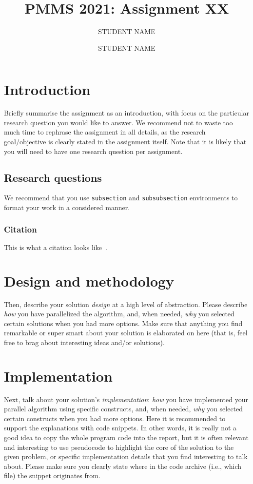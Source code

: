 \documentclass[a4paper,UKenglish,cleveref, autoref, thm-restate]{lipics-v2019}
\title{PMMS 2021: Assignment XX }
\author{STUDENT NAME}{STUDENT NUMBER}{EMAIL ADDRESS}{}{}
\author{STUDENT NAME}{STUDENT NUMBER}{EMAIL ADDRESS}{}{}
\begin{document}
	\maketitle
	


	
	\section{Introduction}
	Briefly summarise the assignment as an introduction, with focus on the particular research question you would like to answer. We recommend not to waste too much time to rephrase the assignment in all details, as the research goal/objective is clearly stated in the assignment itself. Note that it is likely that you will need to have one research question per assignment.

	\subsection{Research questions}
		We recommend that you use \texttt{subsection} and \texttt{subsubsection} environments to format your work in a considered manner.  

	\subsubsection{Citation}
		This is what a citation looks like~\cite{temp}.
		
	\section{Design and methodology}
		Then, describe your solution \textit{design} at a high level of abstraction. Please describe \textit{how} you have parallelized the algorithm, and, when needed, \textit{why} you selected certain solutions when you had more options. Make sure that anything you find remarkable or super smart about your solution is elaborated on here (that is, feel free to brag about interesting ideas and/or solutions).
	
	\section{Implementation}
		Next, talk about your solution's \textit{implementation}: \textit{how} you have implemented your parallel algorithm using specific constructs, and, when needed, \textit{why} you selected certain constructs when you had more options. Here it is recommended to support the explanations with code snippets. In other words, it is really not a good idea to copy the whole program code into the report, but it is often relevant and interesting to use pseudocode to highlight the core of the solution to the given problem, or specific implementation details that you find interesting to talk about. Please make sure you clearly state where in the code archive (i.e., which file) the snippet originates from.
\end{document}
